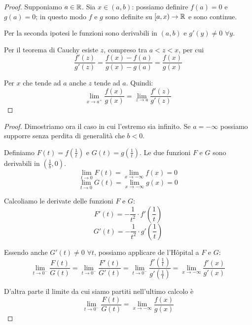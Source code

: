 \begin{proof}
Supponiamo $a \in \mathbb R$. Sia $x \in (a,b)$: possiamo definire $f(a) = 0$ e $g(a) = 0$; in questo modo $f$ e $g$ sono definite su $[a,x) \to \mathbb R$ e sono continue.

Per la seconda ipotesi le funzioni sono derivabili in $(a,b)$ e $g'(y) \neq 0$ $\forall y$.

Per il teorema di Cauchy esiste $z$, compreso tra $a < z < x$, per cui 
\begin{equation*}
\frac{f'(z)}{g'(z)} = \frac{f(x)-f(a)}{g(x)-g(a)} = \frac{f(x)}{g(x)}
\end{equation*}

Per $x$ che tende ad $a$ anche $z$ tende ad $a$. Quindi:
\begin{equation*}
\lim_{x \to a^+} \frac{f(x)}{g(x)} = \lim_{z \to a} \frac{f'(z)}{g'(z)}
\end{equation*}
\end{proof}

\begin{proof}
Dimostriamo ora il caso in cui l'estremo sia infinito. Se $a = -\infty$ possiamo supporre senza perdita di generalità che $b < 0$.

Definiamo $F(t) = f(\frac{1}{t})$ e $G(t) = g(\frac{1}{t})$. Le due funzioni $F$ e $G$ sono derivabili in $(\frac{1}{b}, 0)$.
\begin{equation*}
\lim_{t \to 0} F(t) = \lim_{x \to -\infty} f(x) = 0
\end{equation*}
\begin{equation*}
\lim_{t \to 0} G(t) = \lim_{x \to -\infty} g(x) = 0
\end{equation*}

Calcoliamo le derivate delle funzioni $F$ e $G$:
\begin{equation*}
F'(t) = -\frac{1}{t^2} \cdot f'(\frac{1}{t})
\end{equation*}
\begin{equation*}
G'(t) = -\frac{1}{t^2} \cdot g'(\frac{1}{t})
\end{equation*}

Essendo anche $G'(t) \neq 0$ $\forall t$, possiamo applicare de l'Hôpital a $F$ e $G$:
\begin{equation*}
\lim_{t \to 0^-} \frac{F(t)}{G(t)} = \lim_{t \to 0^-} \frac{F'(t)}{G'(t)} = \lim_{t \to 0^-} \frac{f'(\frac{1}{t})}{g'(\frac{1}{t})} = \lim_{x \to -\infty} \frac{f'(x)}{g'(x)}
\end{equation*}

D'altra parte il limite da cui siamo partiti nell'ultimo calcolo è
\begin{equation*}
\lim_{t \to 0^-} \frac{F(t)}{G(t)} = \lim_{x \to -\infty} \frac{f(x)}{g(x)}
\end{equation*}
\end{proof}

